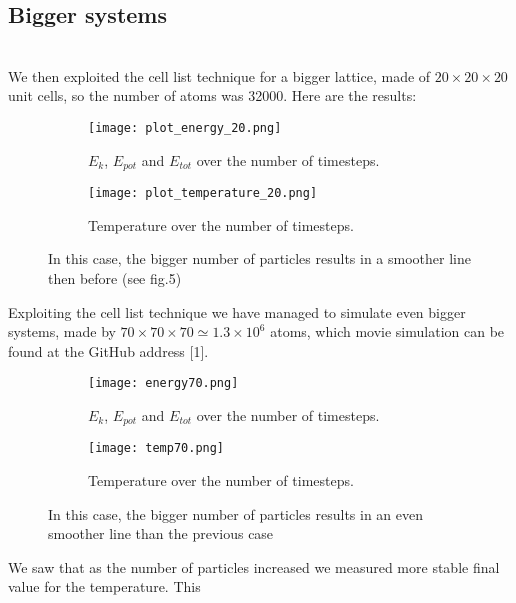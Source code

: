 \documentclass[10pt,a4paper,titlepage]{article}
\begin{document}
\subsection*{Bigger systems}\noindent 
\\We then exploited the cell list technique for a bigger lattice, made of $20 \times 20 \times 20$ unit cells, so the number of atoms was 32000. Here are the results:
\begin{center}
\begin{figure}[H]
 \centering
\begin{subfigure}{.5\textwidth}
  \centering
  \texttt{[image: plot\_energy\_20.png]}
  \caption{$E_k$, $E_{pot}$ and $E_{tot}$ over the number of timesteps.}
  \label{fig:sfig2}
\end{subfigure}%
\begin{subfigure}{.5\textwidth}
  \centering
  \texttt{[image: plot\_temperature\_20.png]}
  \caption{\footnotesize Temperature over the number of timesteps.}
  \label{fig:sfig2}
\end{subfigure}%
\caption{{\footnotesize In this case, the bigger number of particles results in a smoother line then before (see fig.5)}}
\label{fig:fig}
\end{figure}
\end{center} 
Exploiting the cell list technique we have managed to simulate even bigger systems, made by $70\times 70 \times 70 \simeq 1.3 \times 10^6$ atoms, which movie simulation can be found at the GitHub address [1].
\begin{center}
\begin{figure}[H]
 \centering
\begin{subfigure}{.5\textwidth}
  \centering
  \texttt{[image: energy70.png]}
  \caption{$E_k$, $E_{pot}$ and $E_{tot}$ over the number of timesteps.}
  \label{fig:sfig2}
\end{subfigure}%
\begin{subfigure}{.5\textwidth}
  \centering
  \texttt{[image: temp70.png]}
  \caption{\footnotesize Temperature over the number of timesteps.}
  \label{fig:sfig2}
\end{subfigure}%
\caption{{\footnotesize In this case, the bigger number of particles results in an even smoother line than the previous case}}
\label{fig:fig}
\end{figure}
\end{center} 
We saw that as the number of particles increased we measured more stable final value for the temperature. This
\end{document}
